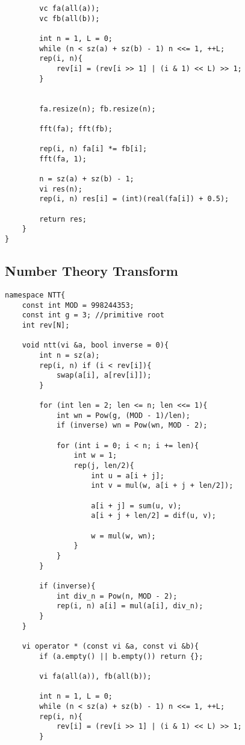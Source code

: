 \documentclass[11pt,a4paper]{article}
\begin{document}
\begin{multicols*}{2}
\begin{lstlisting}
        vc fa(all(a));
        vc fb(all(b));

        int n = 1, L = 0;
        while (n < sz(a) + sz(b) - 1) n <<= 1, ++L;
        rep(i, n){
            rev[i] = (rev[i >> 1] | (i & 1) << L) >> 1;
        }


        fa.resize(n); fb.resize(n);

        fft(fa); fft(fb);

        rep(i, n) fa[i] *= fb[i];
        fft(fa, 1);

        n = sz(a) + sz(b) - 1;
        vi res(n);
        rep(i, n) res[i] = (int)(real(fa[i]) + 0.5);
        
        return res;
    }
}
\end{lstlisting}

\subsection{Number Theory Transform}
\begin{lstlisting}
namespace NTT{
    const int MOD = 998244353;
    const int g = 3; //primitive root
    int rev[N];

    void ntt(vi &a, bool inverse = 0){
        int n = sz(a);
        rep(i, n) if (i < rev[i]){
            swap(a[i], a[rev[i]]);
        }

        for (int len = 2; len <= n; len <<= 1){
            int wn = Pow(g, (MOD - 1)/len);
            if (inverse) wn = Pow(wn, MOD - 2);
            
            for (int i = 0; i < n; i += len){
                int w = 1;
                rep(j, len/2){
                    int u = a[i + j];
                    int v = mul(w, a[i + j + len/2]);

                    a[i + j] = sum(u, v);
                    a[i + j + len/2] = dif(u, v);

                    w = mul(w, wn);
                }
            }
        }

        if (inverse){
            int div_n = Pow(n, MOD - 2);
            rep(i, n) a[i] = mul(a[i], div_n);
        }
    }

    vi operator * (const vi &a, const vi &b){
        if (a.empty() || b.empty()) return {};

        vi fa(all(a)), fb(all(b));

        int n = 1, L = 0;
        while (n < sz(a) + sz(b) - 1) n <<= 1, ++L;
        rep(i, n){
            rev[i] = (rev[i >> 1] | (i & 1) << L) >> 1;
        }


\end{lstlisting}
\end{multicols*}
\end{document}
